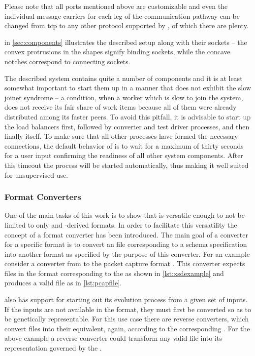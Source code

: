 Please note that all ports mentioned above are customizable and even the individual message carriers for
each leg of the communication pathway can be changed from tcp to any other protocol supported by \zmq, of which
there are plenty.

 in \cref{sec:components} illustrates the described setup along with their 
\zmq sockets -- the convex protrusions in the shapes signify binding sockets, while the concave notches
correspond to connecting sockets.

The described system contains quite a number of components and it is at least somewhat important to start them
up in a manner that does not exhibit the slow joiner syndrome -- a condition, when a worker which is slow to
join the system, does not receive its fair share of work items because all of them were already distributed
among its faster peers. To avoid this pitfall, it is advisable to start up the load balancers first, followed
by converter and test driver processes, and then finally \xmlmate itself. To make sure that all other
processes have formed the necessary connections, the default behavior of \xmlmate is to wait for a maximum of
thirty seconds for a user input confirming the readiness of all other system components. After this timeout the
process will be started automatically, thus making it well suited for unsupervised use.

\subsubsection{Format Converters}
One of the main tasks of this work is to show that \xmlmate is versatile enough to not be limited to 
only \xml and \xml-derived formats. In order to facilitate this versatility the concept of a format 
converter has been introduced. The main goal of a converter for a specific format is to convert an 
\xml file corresponding to a schema specification into another format as specified by the purpose 
of this converter. For an example consider a converter from \xml to the packet capture format \pcap. 
This converter expects \xml files in the format corresponding to the \pcap{} \xsd as shown in
\cref{lst:xsdexample} and produces a valid \pcap file as in \cref{lst:pcapfile}.

\xmlmate also has support for starting out its evolution process from a given set of inputs. If the   
inputs are not available in the \xml format, they must first be converted so as to be genetically 
representable. For this use case there are reverse converters, which convert files into their 
\xml equivalent, again, according to the corresponding \xsd. For the above example a reverse converter 
could transform any valid \pcap file into its \xml representation governed by the \pcap{} \xsd.

